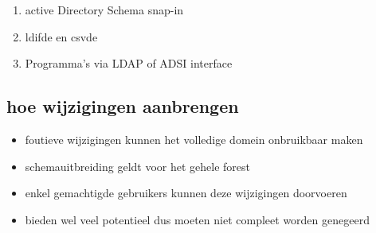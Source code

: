 \begin{enumerate}
	\item active Directory Schema snap-in
	\item ldifde en csvde
	\item Programma's via LDAP of ADSI interface
\end{enumerate}

\subsection{hoe wijzigingen aanbrengen}

\begin{itemize}
	\item foutieve wijzigingen kunnen het volledige domein onbruikbaar maken
	\item schemauitbreiding geldt voor het gehele forest
	\item enkel gemachtigde gebruikers kunnen deze wijzigingen doorvoeren
	\item bieden wel veel potentieel dus moeten niet compleet worden genegeerd
\end{itemize}
